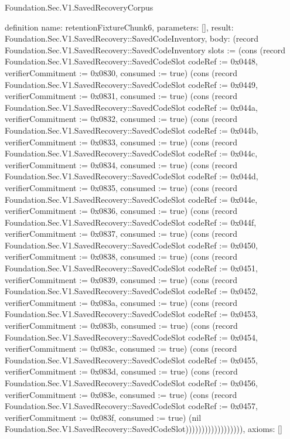 \begin{lexlean}{Foundation.Sec.V1.SavedRecoveryCorpus}
\begin{semanticmodule}
definition{
  name: retentionFixtureChunk6,
  parameters: [],
  result: Foundation.Sec.V1.SavedRecovery::SavedCodeInventory,
  body: (record Foundation.Sec.V1.SavedRecovery::SavedCodeInventory {slots := (cons (record Foundation.Sec.V1.SavedRecovery::SavedCodeSlot {codeRef := 0x0448, verifierCommitment := 0x0830, consumed := true}) (cons (record Foundation.Sec.V1.SavedRecovery::SavedCodeSlot {codeRef := 0x0449, verifierCommitment := 0x0831, consumed := true}) (cons (record Foundation.Sec.V1.SavedRecovery::SavedCodeSlot {codeRef := 0x044a, verifierCommitment := 0x0832, consumed := true}) (cons (record Foundation.Sec.V1.SavedRecovery::SavedCodeSlot {codeRef := 0x044b, verifierCommitment := 0x0833, consumed := true}) (cons (record Foundation.Sec.V1.SavedRecovery::SavedCodeSlot {codeRef := 0x044c, verifierCommitment := 0x0834, consumed := true}) (cons (record Foundation.Sec.V1.SavedRecovery::SavedCodeSlot {codeRef := 0x044d, verifierCommitment := 0x0835, consumed := true}) (cons (record Foundation.Sec.V1.SavedRecovery::SavedCodeSlot {codeRef := 0x044e, verifierCommitment := 0x0836, consumed := true}) (cons (record Foundation.Sec.V1.SavedRecovery::SavedCodeSlot {codeRef := 0x044f, verifierCommitment := 0x0837, consumed := true}) (cons (record Foundation.Sec.V1.SavedRecovery::SavedCodeSlot {codeRef := 0x0450, verifierCommitment := 0x0838, consumed := true}) (cons (record Foundation.Sec.V1.SavedRecovery::SavedCodeSlot {codeRef := 0x0451, verifierCommitment := 0x0839, consumed := true}) (cons (record Foundation.Sec.V1.SavedRecovery::SavedCodeSlot {codeRef := 0x0452, verifierCommitment := 0x083a, consumed := true}) (cons (record Foundation.Sec.V1.SavedRecovery::SavedCodeSlot {codeRef := 0x0453, verifierCommitment := 0x083b, consumed := true}) (cons (record Foundation.Sec.V1.SavedRecovery::SavedCodeSlot {codeRef := 0x0454, verifierCommitment := 0x083c, consumed := true}) (cons (record Foundation.Sec.V1.SavedRecovery::SavedCodeSlot {codeRef := 0x0455, verifierCommitment := 0x083d, consumed := true}) (cons (record Foundation.Sec.V1.SavedRecovery::SavedCodeSlot {codeRef := 0x0456, verifierCommitment := 0x083e, consumed := true}) (cons (record Foundation.Sec.V1.SavedRecovery::SavedCodeSlot {codeRef := 0x0457, verifierCommitment := 0x083f, consumed := true}) (nil Foundation.Sec.V1.SavedRecovery::SavedCodeSlot)))))))))))))))))}),
  axioms: []
}


\end{semanticmodule}
\end{lexlean}
